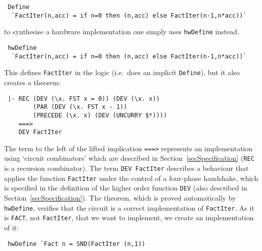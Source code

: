 {\baselineskip10pt\begin{verbatim}
 Define 
  `FactIter(n,acc) = if n=0 then (n,acc) else FactIter(n-1,n*acc))`
\end{verbatim}}

\vspace*{-2mm}

\noindent to synthesise a hardware implementation one simply uses
\texttt{hwDefine} instead.

\vspace*{-2mm}

{\baselineskip10pt\begin{verbatim}
 hwDefine 
  `FactIter(n,acc) = if n=0 then (n,acc) else FactIter(n-1,n*acc))`
\end{verbatim}}

\vspace*{-2mm}

\noindent This defines \texttt{FactIter} in the logic (i.e.~does an
implicit \texttt{Define}), but it also creates a theorem:

\vspace*{-2mm}

{\baselineskip10pt\begin{verbatim}
 |- REC (DEV (\x. FST x = 0)) (DEV (\x. x))
        (PAR (DEV (\x. FST x - 1))
        (PRECEDE (\x. x) (DEV (UNCURRY $*)))) 
    ===> 
    DEV FactIter
\end{verbatim}}

\vspace*{-2mm}

\noindent The term to the left of the lifted implication \texttt{===>}
represents an implementation using
`circuit combinators' which are described in
Section~\ref{secSpecification} (\texttt{REC} is a recursion combinator).  The term \texttt{DEV~FactIter}
describes a behaviour that applies the function \texttt{FactIter}
under the control of a four-phase handshake, which is specified in the
definition of the higher order function \texttt{DEV} (also described
in Section~\ref{secSpecification}). The theorem, which is proved
automatically by \texttt{hwDefine}, verifies that the circuit is a
correct implementation of \texttt{FactIter}. As it is \texttt{FACT}, not
\texttt{FactIter}, that we want to implement, we create an implementation
of it:

\vspace*{-2mm}

{\baselineskip10pt\begin{verbatim}
 hwDefine `Fact n = SND(FactIter (n,1))
\end{verbatim}}

